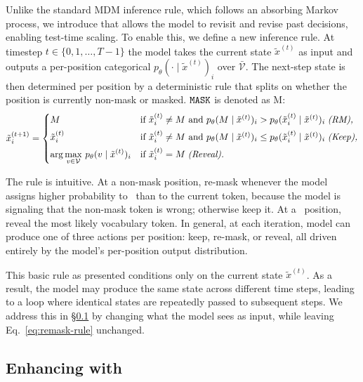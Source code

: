 Unlike the standard MDM inference rule, which follows an absorbing Markov process, we introduce \methodfull that allows the model to revisit and revise past decisions, enabling test-time scaling. To enable this, we define a new inference rule. At timestep $t \in \{0, 1, \ldots, T-1\}$ the model takes the current state $\tilde{x}^{(t)}$ as input and outputs a per-position categorical $p_\theta(\cdot \mid \tilde{x}^{(t)})_i$ over $\bar{\mathcal{V}}$. The next-step state is then determined per position by a deterministic rule that splits on whether the position is currently non-mask or masked. $\texttt{MASK}$ is denoted as M:
\begin{equation}
\tilde{x}^{(t+1)}_i =
\begin{cases}
M
& \text{if } \tilde{x}^{(t)}_i \neq M \text{ and } p_\theta(M \mid \tilde{x}^{(t)})_i > p_\theta(\tilde{x}^{(t)}_i \mid \tilde{x}^{(t)})_i \; \textit{\text{(RM),}} \\[4pt]
\tilde{x}^{(t)}_i
& \text{if } \tilde{x}^{(t)}_i \neq M \text{ and } p_\theta(M \mid \tilde{x}^{(t)})_i \leq p_\theta(\tilde{x}^{(t)}_i \mid \tilde{x}^{(t)})_i \; \textit{\text{(Keep),}} \\[4pt]
\displaystyle \arg\max_{v \in \mathcal{V}}\, p_\theta(v \mid \tilde{x}^{(t)})_i
& \text{if } \tilde{x}^{(t)}_i = M \; \textit{\text{(Reveal).}}
\end{cases}
\label{eq:remask-rule}
\end{equation}

The rule is intuitive. At a non-mask position, re-mask whenever the model assigns higher probability to \mask\ than to the current token, because the model is signaling that the non-mask token is wrong; otherwise keep it. At a \mask\ position, reveal the most likely vocabulary token. In general, at each iteration, model can produce one of three actions per position: keep, re-mask, or reveal, all driven entirely by the model’s per-position output distribution.


This basic rule as presented conditions only on the current state $\tilde{x}^{(t)}$. As a result, the model may produce the same state across different time steps, leading to a loop where identical states are repeatedly passed to subsequent steps. We address this in \S\ref{sec:temporal-residual} by changing what the model sees as input, while leaving Eq.~\eqref{eq:remask-rule} unchanged.
\subsection{Enhancing \methodfull with \temporalmethodfull }
\label{sec:temporal-residual}

